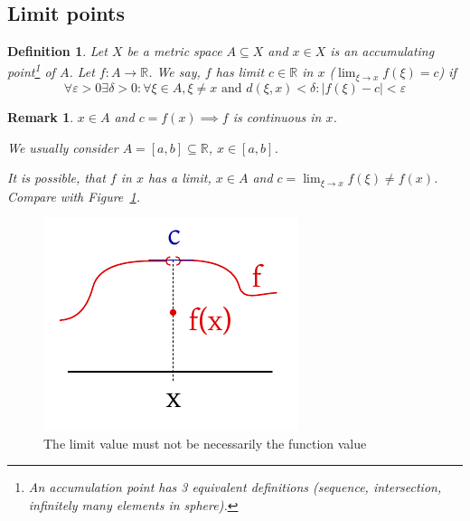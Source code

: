 \documentclass{article}
\newtheorem{definition}{Definition}  \numberwithin{definition}{section}
\newtheorem{remark}{Remark}  \numberwithin{remark}{section}
\newcommand{\card}[1]{\left|#1\right|}
\begin{document}
\subsection{Limit points}

\begin{definition} %
  Let $X$ be a metric space $A \subseteq X$ and $x \in X$ is an accumulating point\footnote{An accumulation point has 3 equivalent definitions (sequence, intersection, infinitely many elements in sphere).} of $A$.
  Let $f: A \to \mathbb R$. We say, $f$ has limit $c \in \mathbb R$ in $x$ ($\lim_{\xi\to x} f(\xi) = c$) if
  \[
    \forall \varepsilon > 0 \exists \delta > 0: \forall \xi \in A, \xi \neq x \text{ and } d(\xi, x) < \delta:
    \card{f(\xi) - c} < \varepsilon
  \]
\end{definition}

\begin{remark}
  $x \in A$ and $c = f(x) \implies f$ is continuous in $x$.

  We usually consider $A = [a,b] \subseteq \mathbb R$, $x \in [a,b]$.

  It is possible, that $f$ in $x$ has a limit, $x \in A$ and $c = \lim_{\xi\to x} f(\xi) \neq f(x)$.
  Compare with Figure~\ref{img:limfuncvalue}.
\end{remark}

\begin{figure}[t]
  \begin{center}
    \includegraphics{img/14_special_case_limit_value_not_function_value.pdf}
    \caption{The limit value must not be necessarily the function value}
    \label{img:limfuncvalue}
  \end{center}
\end{figure}
\end{document}
